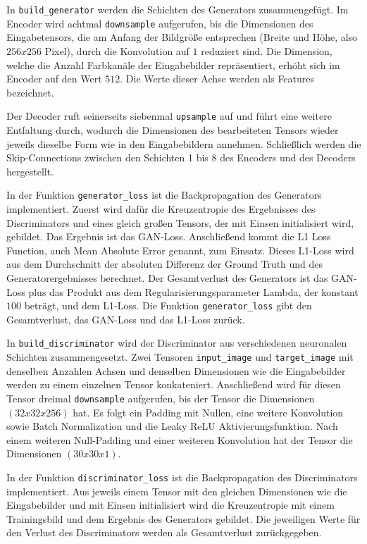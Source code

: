 In \lstinline|build_generator| werden die Schichten des Generators zusammengefügt. Im Encoder wird achtmal \lstinline|downsample| aufgerufen, bis die Dimensionen des Eingabetensors, die am Anfang der Bildgröße entsprechen (Breite und Höhe, also $256x256$ Pixel), durch die Konvolution auf $1$ reduziert sind. Die Dimension, welche die Anzahl Farbkanäle der Eingabebilder repräsentiert, erhöht sich im Encoder auf den Wert $512$. Die Werte dieser Achse werden als Features \cite{zhang2020dive} \cite{chollet2021deep} \cite{zaccone2018tensorflow} bezeichnet.

Der Decoder ruft seinerseits siebenmal \lstinline|upsample| auf und führt eine weitere Entfaltung durch, wodurch die Dimensionen des bearbeiteten Tensors wieder jeweils dieselbe Form wie in den Eingabebildern annehmen. Schließlich werden die Skip-Connections zwischen den Schichten 1 bis 8 des Encoders und des Decoders hergestellt.

In der Funktion \lstinline|generator_loss| ist die Backpropagation des Generators implementiert. Zuerst wird dafür die Kreuzentropie des Ergebnisses des Discriminators und eines gleich großen Tensors, der mit Einsen initialisiert wird, gebildet. Das Ergebnis ist das GAN-Loss. Anschließend kommt die L1 Loss Function, auch Mean Absolute Error genannt, zum Einsatz. Dieses L1-Loss wird aus dem Durchschnitt der absoluten Differenz der Ground Truth und des Generatorergebnisses berechnet. Der Gesamtverlust des Generators ist das GAN-Loss plus das Produkt aus dem Regularisierungsparameter Lambda, der konstant $100$ beträgt, und dem L1-Loss. Die Funktion \lstinline|generator_loss| gibt den Gesamtverlust, das GAN-Loss und das L1-Loss zurück.

In \lstinline|build_discriminator| wird der Discriminator aus verschiedenen neuronalen Schichten zusammengesetzt. Zwei Tensoren \lstinline|input_image| und \lstinline|target_image| mit denselben Anzahlen Achsen und denselben Dimensionen wie die Eingabebilder werden zu einem einzelnen Tensor konkateniert. Anschließend wird für diesen Tensor dreimal \lstinline|downsample| aufgerufen, bis der Tensor die Dimensionen $(32x32x256)$ hat. Es folgt ein Padding mit Nullen, eine weitere Konvolution sowie Batch Normalization und die Leaky ReLU Aktivierungsfunktion. Nach einem weiteren Null-Padding und einer weiteren Konvolution hat der Tensor die Dimensionen $(30x30x1)$.

In der Funktion \lstinline|discriminator_loss| ist die Backpropagation des Discriminators implementiert. Aus jeweils einem Tensor mit den gleichen Dimensionen wie die Eingabebilder und mit Einsen initialisiert wird die Kreuzentropie mit einem Trainingsbild und dem Ergebnis des Generators gebildet. Die jeweiligen Werte für den Verlust des Discriminators werden als Gesamtverlust zurückgegeben.

